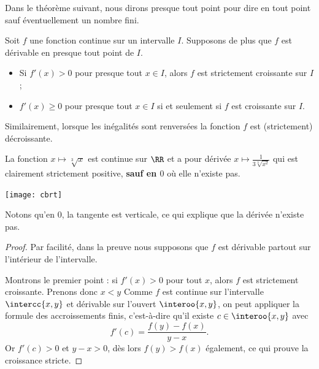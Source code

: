 \begin{frame}%
  Dans le théorème suivant, nous dirons \og presque tout point\fg{} pour dire \og en tout point sauf éventuellement un nombre fini\fg{}.\pause
  \begin{theorem}
    Soit \(f\) une fonction continue sur un intervalle \(I\). Supposons de plus que \(f\) est dérivable en presque tout point de \(I\).\pause{}
    \begin{itemize}
    \item Si \(f'(x) > 0\) pour presque tout \(x \in I\),\pause{} alors \(f\) est strictement croissante sur \(I\);\pause
    \item \(f'(x) \geq 0\) pour presque tout \(x \in I\) si et seulement si\pause{} \(f\) est croissante sur \(I\).
    \end{itemize}\pause
    Similairement, lorsque les inégalités sont renversées la fonction \(f\) est (strictement) décroissante.
  \end{theorem}
\end{frame}
\begin{frame}
  \begin{example}
  La fonction \(x\mapsto \sqrt[3]x\) est continue sur \(\RR\) et a pour dérivée \(x \mapsto \frac{1}{3\sqrt[3]{x^{2}}}\) qui est clairement strictement positive, \textbf{sauf en \(0\)} où elle n'existe pas.
    \begin{center}
      \texttt{[image: cbrt]}
    \end{center}
  \end{example}\pause
  \begin{remark*}
    Notons qu'en \(0\), la tangente est verticale, ce qui explique que la dérivée n'existe pas.
  \end{remark*}
\end{frame}
\begin{frame}%
  \begin{proof}
    Par facilité, dans la preuve nous supposons que \(f\) est dérivable partout sur l'intérieur de l'intervalle.\pause{}

    Montrons le premier point : si \(f'(x) > 0\) pour tout \(x\), alors \(f\) est strictement croissante. Prenons donc \(x < y\)\pause{} Comme \(f\) est continue sur l'intervalle \(\intercc{x,y}\) et dérivable sur l'ouvert \(\interoo{x,y}\), on peut appliquer la formule des accroissements finis\pause{}, c'est-à-dire qu'il existe \(c \in \interoo{x,y}\) avec
    \begin{equation*}
      f'(c) = \frac{f(y)-f(x)}{y-x}.
    \end{equation*}\pause{}
    Or \(f'(c) > 0\) et \(y-x > 0\)\pause{}, dès lors \(f(y) > f(x)\) également, ce qui prouve la croissance stricte.\noqed
  \end{proof}
\end{frame}
